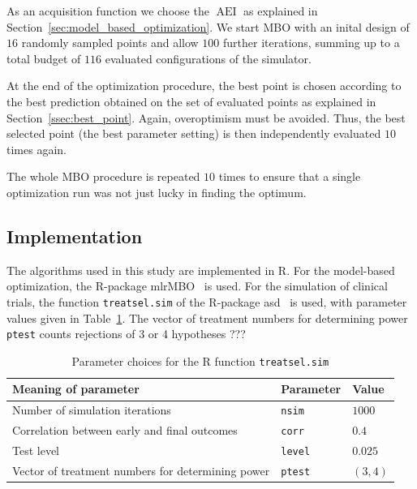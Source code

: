 \documentclass[bimj,fleqn]{w-art}
\theoremstyle{plain}
\theoremstyle{definition}
\begin{document}
As an acquisition function we choose the $\operatorname{AEI}$ as explained in Section~\ref{sec:model_based_optimization}.
We start MBO with an inital design of $16$ randomly sampled points and allow $100$ further iterations, summing up to a total budget of $116$ evaluated configurations of the simulator.

At the end of the optimization procedure, the best point is chosen according to the best prediction obtained on the set of evaluated points as explained in Section~\ref{ssec:best_point}.
Again, overoptimism must be avoided. Thus, the best selected point (the best parameter setting) is then independently evaluated $10$ times again.

The whole MBO procedure is repeated $10$ times to ensure that a single optimization run was not just lucky in finding the optimum.

\subsection{Implementation}

The algorithms used in this study are implemented in R.
For the model-based optimization, the R-package mlrMBO~\citep{bischl_mlrmbo_2017} is used.
For the simulation of clinical trials, the function \texttt{treatsel.sim} of the R-package asd~\citep{parsons_software_2011} is used, with parameter values given in Table~\ref{tab:par_implement}.
The vector of treatment numbers for determining power \texttt{ptest} counts rejections of 3 or 4 hypotheses ???

\begin{table}[h]
  \caption{Parameter choices for the R function \texttt{treatsel.sim}}
  \label{tab:par_implement}
  \centering
  \begin{tabular}{lll}
  \hline
  Meaning of parameter & Parameter & Value \\
  \hline
  Number of simulation iterations & \texttt{nsim} & $1000$ \\
  Correlation between early and final outcomes & \texttt{corr} & $0.4$ \\
  Test level & \texttt{level} & $0.025$ \\
  Vector of treatment numbers for determining power & \texttt{ptest} & $(3,4)$ \\
  \hline
  \end{tabular}
\end{table}


\end{document}

